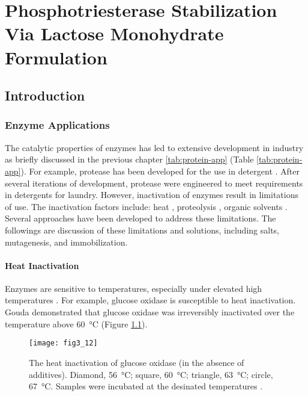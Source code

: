 \chapter{Phosphotriesterase Stabilization Via Lactose Monohydrate Formulation}
\label{chap:lactose}

\begin{refsection}

\section{Introduction}

\subsection{Enzyme Applications}

The catalytic properties of enzymes has led to extensive development in industry
as briefly discussed in the previous chapter \ref{tab:protein-app} (Table
\ref{tab:protein-app}). For example, protease has been developed for the use in
detergent \cite{Kirk2002}. After several iterations of development, protease
were engineered to meet requirements in detergents for laundry.  However,
inactivation of enzymes result in limitations of use. The inactivation factors
include: heat \cite{Shirley1995,Perdana2012,Etzel1996,Gouda2003}, proteolysis
\cite{VandenBurg2002a,Ahmad2012}, organic solvents
\cite{LeJeune1997a,Izutsu2009,Stepankova2013}. Several approaches have been
developed to address these limitations. The followings are discussion of
these limitations and solutions, including salts, mutagenesis, and
immobilization.

\subsubsection{Heat Inactivation}

Enzymes are sensitive to temperatures, especially under elevated high
temperatures \cite{Perdana2012,Etzel1996}. For example, glucose oxidase
\cite{Gouda2003} is susceptible to heat inactivation. Gouda 
demonstrated that glucose oxidase was irreversibly inactivated over the
temperature above \SI{60}{\celsius} \cite{Gouda2003} (Figure
\ref{fig:heat-inactivation-exmaple}). 
\begin{figure}[h!] \centering \texttt{[image: fig3\_12]}
    \caption[The heat inactivation of glucose oxidase (in the absence of
    additives). Diamond, \SI{56}{\celsius};  square, \SI{60}{\celsius};
triangle, \SI{63}{\celsius}; circle, \SI{67}{\celsius}. Samples were incubated
at the desinated temperatures.]{The heat inactivation of glucose oxidase (in
    the absence of additives). Diamond, \SI{56}{\celsius};  square,
    \SI{60}{\celsius}; triangle, \SI{63}{\celsius}; circle, \SI{67}{\celsius}.
    Samples were incubated at the desinated temperatures \cite{Gouda2003}.}
    \label{fig:heat-inactivation-exmaple}
\end{figure}


\end{refsection}
